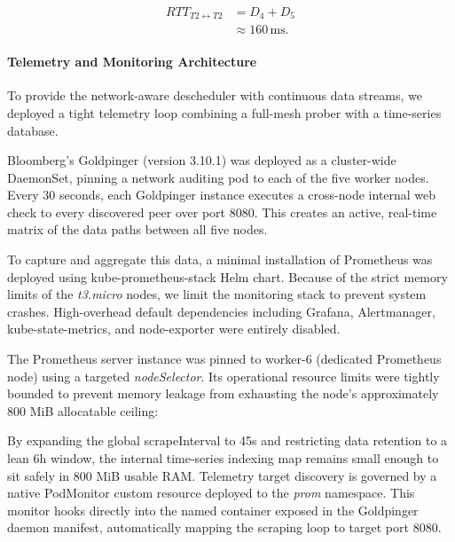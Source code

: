 \[
\begin{aligned}
RTT_{T2\leftrightarrow T2}
&=
D_4 + D_5\\
&\approx 160\,\text{ms}.
\end{aligned}
\]


\paragraph{Telemetry and Monitoring Architecture}
\label{subsubsec:netaware4_monitoringsetup}
To provide the network-aware descheduler with continuous data streams, we deployed a tight telemetry loop combining a full-mesh prober with a time-series database.

Bloomberg's Goldpinger (version 3.10.1) was deployed as a cluster-wide DaemonSet, pinning a network auditing pod to each of the five worker nodes. Every 30 seconds, each Goldpinger instance executes a cross-node internal web check to every discovered peer over port 8080. This creates an active, real-time matrix of the data paths between all five nodes.

To capture and aggregate this data, a minimal installation of Prometheus was deployed using kube-prometheus-stack Helm chart. Because of the strict memory limits of the \textit{t3.micro} nodes, we limit the monitoring stack to prevent system crashes. High-overhead default dependencies including Grafana, Alertmanager, kube-state-metrics, and node-exporter were entirely disabled.

The Prometheus server instance was pinned to worker-6 (dedicated Prometheus node) using a targeted \emph{nodeSelector}. Its operational resource limits were tightly bounded to prevent memory leakage from exhausting the node's approximately 800 MiB allocatable ceiling:

\begin{figure}[tbp]
    \centering
    \begin{minipage}{0.95\textwidth}
    
    \end{minipage}
\end{figure}

By expanding the global scrapeInterval to 45s and restricting data retention to a lean 6h window, the internal time-series indexing map remains small enough to sit safely in 800 MiB usable RAM. Telemetry target discovery is governed by a native PodMonitor custom resource deployed to the \emph{prom} namespace. This monitor hooks directly into the named container exposed in the Goldpinger daemon manifest, automatically mapping the scraping loop to target port 8080.

